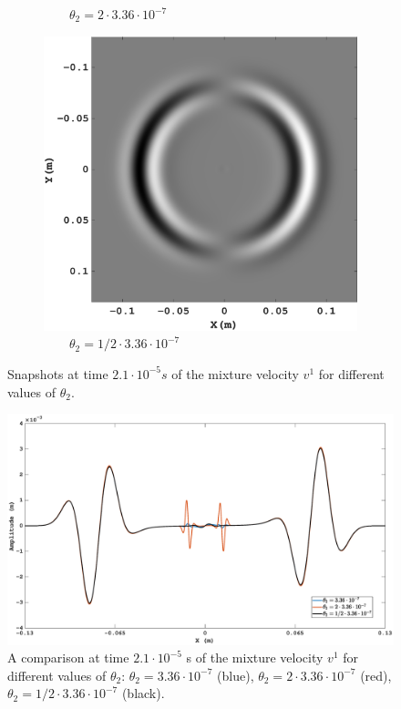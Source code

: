 \documentclass[3p,times,table]{article}
\begin{document}
\begin{figure}[!htbp]
\begin{subfigure}{0.3\linewidth}
\caption{$ \quad\quad \theta_2=2\cdot3.36\cdot10^{-7} $}
\end{subfigure}%
\hfill
\begin{subfigure}{0.3\linewidth}
\includegraphics[draft=false,width=1\textwidth]{Figures/Xi_31_new}
\caption{$ \quad\quad \theta_2=1/2\cdot3.36\cdot10^{-7} $}
\end{subfigure}%
\caption{Snapshots at time $2.1\cdot10^{-5}s$ of the mixture velocity $v^1$ for different values of $ \theta_2 $.}
\label{fig:compare_friction}
\end{figure}
\begin{figure}[!htbp]
	\begin{center}
		\includegraphics[draft=false,width=1.0\textwidth]{Figures/Compare_Xi_1}
	\end{center}
	\caption{A comparison at time $2.1\cdot10^{-5}$ s of the mixture velocity 
	$v^1$ for different values of $ \theta_2 $: $ \theta_2 
	=3.36\cdot10^{-7}$ (blue), $ \theta_2=2 \cdot 3.36\cdot10^{-7} $ (red), $ 
	\theta_2=1/2 \cdot 3.36\cdot10^{-7} $ (black).}
	\label{fig:compare_friction_line}
\end{figure}
\end{document}
